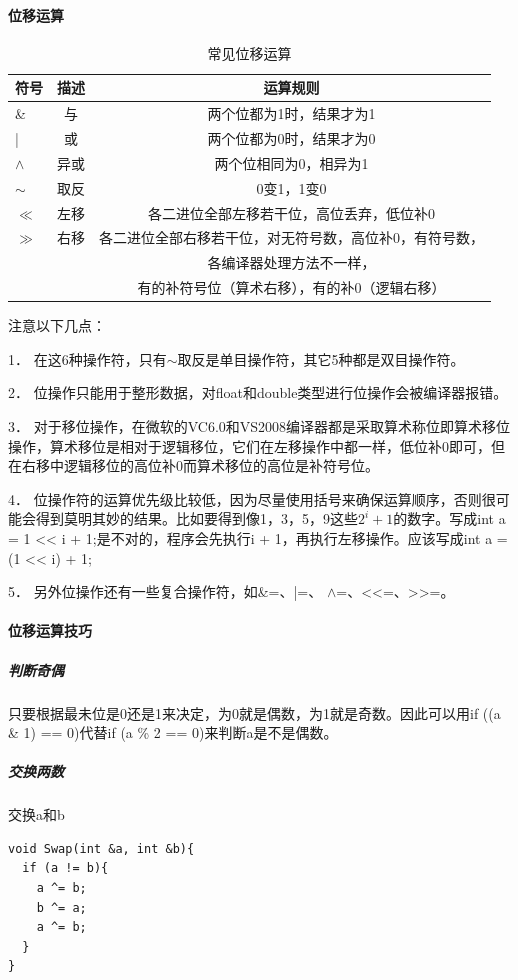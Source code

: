 \documentclass[12pt]{article}  %
\begin{document}
\paragraph{位移运算}

\begin{table}[h]
   \centering
   \begin{tabular}{|l|c|c|}             \hline
     符号 & 描述 & 运算规则               \\\hline
     \&       & 与     & 两个位都为1时，结果才为1    \\
     |        & 或     & 两个位都为0时，结果才为0                      \\
     $\wedge$ & 异或    & 两个位相同为0，相异为1                      \\
     $\sim$   & 取反    & 0变1，1变0                      \\
     $\ll$    & 左移    & 各二进位全部左移若干位，高位丢弃，低位补0                     \\
     $\gg$    & 右移    & 各二进位全部右移若干位，对无符号数，高位补0，有符号数，\\
     &&各编译器处理方法不一样，\\
     &&有的补符号位（算术右移），有的补0（逻辑右移）                     \\\hline
   \end{tabular}
   \caption{常见位移运算}
   \label{tab:Margin_settings}
\end{table}

注意以下几点：

1．  在这6种操作符，只有$\sim$取反是单目操作符，其它5种都是双目操作符。

2．  位操作只能用于整形数据，对float和double类型进行位操作会被编译器报错。

3．  对于移位操作，在微软的VC6.0和VS2008编译器都是采取算术称位即算术移位操作，算术移位是相对于逻辑移位，它们在左移操作中都一样，低位补0即可，但在右移中逻辑移位的高位补0而算术移位的高位是补符号位。

4．  位操作符的运算优先级比较低，因为尽量使用括号来确保运算顺序，否则很可能会得到莫明其妙的结果。比如要得到像1，3，5，9这些$2^i+1$的数字。写成int a = 1 << i + 1;是不对的，程序会先执行i + 1，再执行左移操作。应该写成int a = (1 << i) + 1;

5．  另外位操作还有一些复合操作符，如\&=、|=、 $\wedge$=、<<=、>>=。

\paragraph{位移运算技巧}

\subparagraph{判断奇偶}
只要根据最未位是0还是1来决定，为0就是偶数，为1就是奇数。因此可以用if ((a \& 1) == 0)代替if (a \% 2 == 0)来判断a是不是偶数。

\subparagraph{交换两数}
交换a和b
{\setmainfont{Menlo}
\begin{lstlisting}
void Swap(int &a, int &b){
  if (a != b){
    a ^= b;
    b ^= a;
    a ^= b;
  }
}
\end{lstlisting}}
\end{document}
